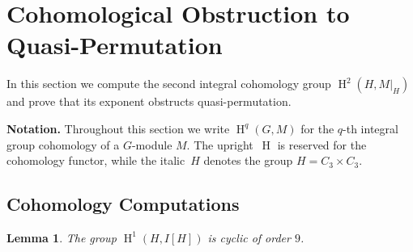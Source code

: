 \documentclass[12pt,a4paper]{article}
\newtheorem{lemma}[theorem]{Lemma}
\theoremstyle{definition}
\newtheorem{remark}[theorem]{Remark}
\DeclareMathOperator{\coh}{H}
\begin{document}

\section{Cohomological Obstruction to Quasi-Permutation}
\label{sec:cohom}

In this section we compute the second integral cohomology group
\(\coh^2(H, M|_H)\) and prove that its exponent obstructs quasi-permutation.

\medskip\noindent
\textbf{Notation.}
Throughout this section we write \(\coh^q(G, M)\) for the \(q\)-th
integral group cohomology of a \(G\)-module \(M\).  The upright~\(\coh\)
is reserved for the cohomology functor, while the italic~\(H\) denotes
the group \(H = C_3 \times C_3\).

\subsection{Cohomology Computations}

\begin{lemma}\label{lem:H1-IH}
The group \(\coh^1(H, I[H])\) is cyclic of order \(9\).
\end{lemma}
\end{document}
